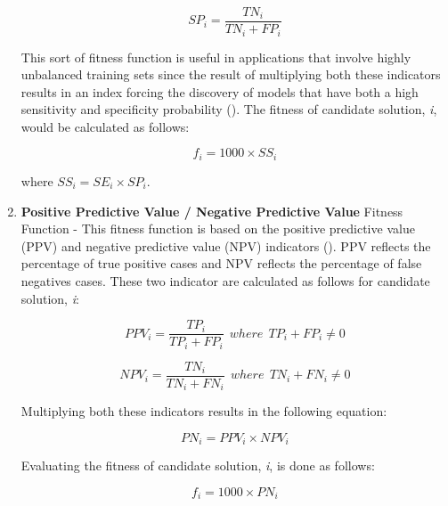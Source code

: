 \begin{enumerate}
    \begin{ceqn}
        \begin{equation}\label{alg:specificity}
            SP_i = \frac{TN_i}{TN_i + FP_i}
        \end{equation}
    \end{ceqn}

    \noindent This sort of fitness function is useful in applications that involve highly unbalanced training sets since the result of multiplying both these indicators results in an index forcing the discovery of models that have both a high sensitivity and specificity probability (\cite{ferreira2006gene}). The fitness of candidate solution, \textit{i}, would be calculated as follows:
    \begin{ceqn}
        \begin{equation}\label{alg:ss_fitness}
            f_i = 1000 \times SS_i
        \end{equation}
    \end{ceqn}

    \noindent where $SS_i = SE_i \times SP_i$.

    \item \textbf{Positive Predictive Value / Negative Predictive Value} Fitness Function - This fitness function is based on the positive predictive value (PPV) and negative predictive value (NPV) indicators (\cite{ferreira2006gene}). PPV reflects the percentage of true positive cases and NPV reflects the percentage of false negatives cases. These two indicator are calculated as follows for candidate solution, \textit{i}:
    \begin{ceqn}
        \begin{equation}\label{alg:ppv}
            PPV_i = \frac{TP_i}{TP_i + FP_i}\:\:where \:\: TP_i + FP_i \neq 0
        \end{equation}
    \end{ceqn}

    \begin{ceqn}
        \begin{equation}\label{alg:npv}
            NPV_i = \frac{TN_i}{TN_i + FN_i}\:\:where \:\: TN_i + FN_i \neq 0
        \end{equation}
    \end{ceqn}
    \noindent Multiplying both these indicators results in the following equation:

    \begin{ceqn}
        \begin{equation}\label{alg:ppv_npv}
            PN_i = PPV_i \times NPV_i
        \end{equation}
    \end{ceqn}
    \noindent Evaluating the fitness of candidate solution, \textit{i}, is done as follows:
    \begin{ceqn}
        \begin{equation}\label{alg:ppv_fitness}
            f_i = 1000 \times PN_i
        \end{equation}
    \end{ceqn}


\end{enumerate}
